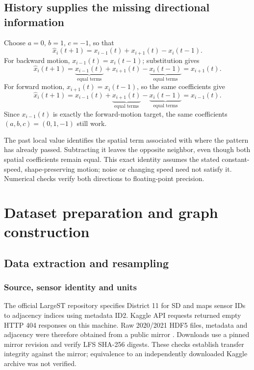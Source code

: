 \documentclass[11pt,a4paper]{article}
\newcommand{\cancelterm}[1]{\underbrace{#1}_{\text{equal terms}}}
\begin{document}
\subsection{History supplies the missing directional information}

Choose \(a=0\), \(b=1\), \(c=-1\), so that
\begin{equation}\widehat x_i(t+1)=x_{i-1}(t)+x_{i+1}(t)-x_i(t-1).\end{equation}
For backward motion, \(x_{i-1}(t)=x_i(t-1)\); substitution gives
\begin{equation}\widehat x_i(t+1)=\cancelterm{x_{i-1}(t)}+x_{i+1}(t)-\cancelterm{x_i(t-1)}=x_{i+1}(t).\end{equation}
For forward motion, \(x_{i+1}(t)=x_i(t-1)\), so the same coefficients give
\begin{equation}\widehat x_i(t+1)=x_{i-1}(t)+\cancelterm{x_{i+1}(t)}-\cancelterm{x_i(t-1)}=x_{i-1}(t).\end{equation}
Since \(x_{i-1}(t)\) is exactly the forward-motion target, the same coefficients \((a,b,c)=(0,1,-1)\) still work.


The past local value identifies the spatial term associated with where the pattern has already passed. Subtracting it leaves the opposite neighbor, even though both spatial coefficients remain equal. This exact identity assumes the stated constant-speed, shape-preserving motion; noise or changing speed need not satisfy it. Numerical checks verify both directions to floating-point precision.


\FloatBarrier\section{Dataset preparation and graph construction}\label{sec:q3}\subsection{Data extraction and resampling}
\subsubsection{Source, sensor identity and units}

The official LargeST repository \cite{largest-repo} specifies District 11 for SD and maps sensor IDs to adjacency indices using metadata ID2. Kaggle API requests returned empty HTTP 404 responses on this machine. Raw 2020/2021 HDF5 files, metadata and adjacency were therefore obtained from a public mirror \cite{mirror}. Downloads use a pinned mirror revision and verify LFS SHA-256 digests. These checks establish transfer integrity against the mirror; equivalence to an independently downloaded Kaggle archive was not verified.
\end{document}
